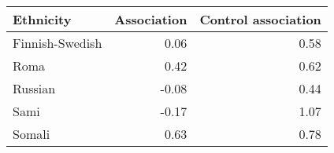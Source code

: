 \begin{tabular}{lrr}
\toprule
      Ethnicity &  Association &  Control association \\
\midrule
Finnish-Swedish &         0.06 &                 0.58 \\
           Roma &         0.42 &                 0.62 \\
        Russian &        -0.08 &                 0.44 \\
           Sami &        -0.17 &                 1.07 \\
         Somali &         0.63 &                 0.78 \\
\bottomrule
\end{tabular}
